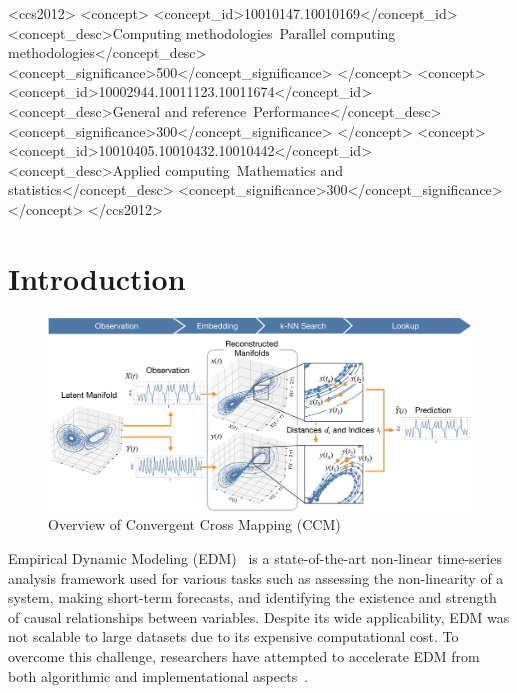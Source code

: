 \documentclass[sigconf]{acmart}
\begin{document}

\begin{CCSXML}
<ccs2012>
   <concept>
       <concept_id>10010147.10010169</concept_id>
       <concept_desc>Computing methodologies~Parallel computing methodologies</concept_desc>
       <concept_significance>500</concept_significance>
       </concept>
   <concept>
       <concept_id>10002944.10011123.10011674</concept_id>
       <concept_desc>General and reference~Performance</concept_desc>
       <concept_significance>300</concept_significance>
       </concept>
   <concept>
       <concept_id>10010405.10010432.10010442</concept_id>
       <concept_desc>Applied computing~Mathematics and statistics</concept_desc>
       <concept_significance>300</concept_significance>
       </concept>
 </ccs2012>
\end{CCSXML}


\maketitle

\section{Introduction}

\begin{figure}
    \centering
    \includegraphics[width=.95\linewidth]{figs/xmap_overview}
    \caption{Overview of Convergent Cross Mapping (CCM)}\label{fig:edm}
\end{figure}

Empirical Dynamic Modeling (EDM)~\cite{Chang2017} is a state-of-the-art
non-linear time-series analysis framework used for various tasks such as
assessing the non-linearity of a system, making short-term forecasts, and
identifying the existence and strength of causal relationships between
variables. Despite its wide applicability, EDM was not scalable to large
datasets due to its expensive computational cost. To overcome this challenge,
researchers have attempted to accelerate EDM from both algorithmic and
implementational aspects~\cite{Pu2019,Ma2014}.
\end{document}
